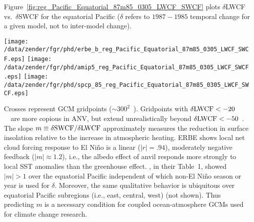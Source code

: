 \documentclass[agums]{aguplus}
\begin{document}
Figure~\ref{fig:reg_Pacific_Equatorial_87m85_0305_LWCF_SWCF} plots 
$\delta$LWCF vs.\ $\delta$SWCF for the equatorial Pacific
($\delta$ refers to $1987 - 1985$ temporal change for a given model,
not to inter-model change). 
\begin{figure*}
\begin{center}
\texttt{[image: /data/zender/fgr/phd/erbe\_b\_reg\_Pacific\_Equatorial\_87m85\_0305\_LWCF\_SWCF.eps]}%
\texttt{[image: /data/zender/fgr/phd/amip5\_reg\_Pacific\_Equatorial\_87m85\_0305\_LWCF\_SWCF.eps]}%
\texttt{[image: /data/zender/fgr/phd/spcp\_85\_reg\_Pacific\_Equatorial\_87m85\_0305\_LWCF\_SWCF.eps]}%
\end{center}
\caption[$1987-1985$ differences in Spring quarter (March, April, and
May) mean maritime LWCF and SWCF over the Equatorial Pacific for ERBE,
CCM, and ANV]{ 
$1987-1985$ differences in Spring quarter (March, April, and May) 
mean maritime LWCF and SWCF (\wxmS) over the Equatorial Pacific 
(10~\dgr S--10~\dgr N, 140~\dgr E--90~\dgr W)
for (a) ERBE, (b) CCM, and (c) ANV.
Solid line is least-squares fit.
\label{fig:reg_Pacific_Equatorial_87m85_0305_LWCF_SWCF}}   
\end{figure*}
Crosses represent GCM gridpoints ($\sim 300^2$~\kmS).
Gridpoints with $\delta \mbox{\textrm{LWCF}} < -20$~\wxmS\ are more copious in ANV,
but extend unrealistically beyond $\delta \mbox{\textrm{LWCF}} < -50$~\wxmS.
The slope $m \equiv \delta \mbox{\textrm{SWCF}} / \delta \mbox{\textrm{LWCF}}$ approximately
measures the reduction in surface insolation relative to the increase
in atmospheric heating. 
ERBE shows local net cloud forcing response to El Ni\~no is a linear
($|r| = .94$), moderately negative feedback ($|m| \approx 1.2$), i.e.,
the albedo effect of anvil responds more strongly to local SST
anomalies than the greenhouse effect. 
\cite{RaC91}, in their Table~1, showed $|m| > 1$ over the equatorial
Pacific independent of which non-El Ni\~no season or year is used for
$\delta$. 
Moreover, the same qualitative behavior is ubiquitous over equatorial
Pacific subregions (i.e., east, central, west) (not shown).
Thus predicting $m$ is a necessary condition for coupled
ocean-atmosphere GCMs used for climate change research. 
\end{document}
